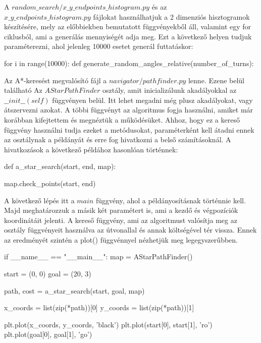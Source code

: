 
A $ random\_search/x\_y\_endpoints\_histogram.py $ és az\\ $ x\_y\_endpoints\_histogram.py $ fájlokat használhatjuk a 2 dimenziós hisztogramok készítésére, mely az előbbiekben bemutatott függvényekből áll, valamint egy for ciklusból, ami a generálás mennyiségét adja meg. Ezt a következő helyen tudjuk paraméterezni, ahol jelenleg 10000 esetet generál futtatáskor:
\begin{python}
for i in range(10000):
    def generate_random_angles_relative(number_of_turns):
\end{python}



Az A*-keresést megvalósító fájl a $ navigator/pathfinder.py $ lenne. Ezene belül található Az $ AStarPathFinder $ osztály, amit inicializálunk akadályokkal az $\_\_init\_\_(self)$ függvényen belül. Itt lehet megadni még plusz akadályokat, vagy átszervezni azokat. A többi függvényt az algoritmus fogja használni, amiket már korábban kifejtettem és megnéztük a működésüket. Ahhoz, hogy ez a kereső függvény használni tudja ezeket a metódusokat, paraméterként kell átadni ennek az osztálynak a példányát és erre fog hivatkozni a belső számításoknál. A hivatkozások a következő példához hasonlóan történnek:
\begin{python}
def a_star_search(start, end, map):

    map.check_points(start, end)
\end{python}

A következő lépés itt a $ main $ függvény, ahol a példányosításnak történnie kell. Majd meghatározzuk a másik két paramétert is, ami a kezdő és végpozíciók koordinátáit jelenti. A kereső függvény, ami az algoritmust valósítja meg az osztály függvényeit használva az útvonallal és annak költségével tér vissza. Ennek az eredményét szintén a plot() függvénnyel nézhetjük meg legegyszerűbben.
\begin{python}
if __name__ == "__main__":
    map = AStarPathFinder()

    start = (0, 0)
    goal = (20, 3)

    path, cost = a_star_search(start, goal, map)
    
    x_coords = list(zip(*path))[0]
    y_coords = list(zip(*path))[1]
    
    plt.plot(x_coords, y_coords, 'black')
    plt.plot(start[0], start[1], 'ro')
    plt.plot(goal[0], goal[1], 'go')
\end{python}

